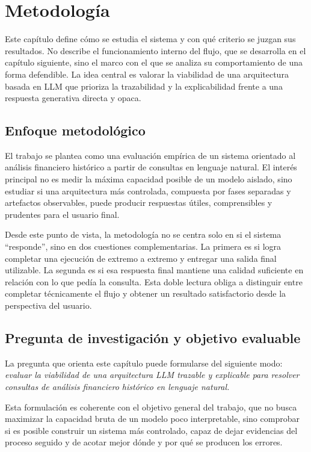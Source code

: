 \chapter{Metodolog\'ia}

Este cap\'itulo define c\'omo se estudia el sistema y con qu\'e criterio se juzgan sus resultados. No describe el funcionamiento interno del flujo, que se
desarrolla en el cap\'itulo siguiente, sino el marco con el que se analiza su comportamiento de una forma defendible. La idea central es valorar la
viabilidad de una arquitectura basada en LLM que prioriza la trazabilidad y la explicabilidad frente a una respuesta generativa directa y opaca.

\section{Enfoque metodol\'ogico}

El trabajo se plantea como una evaluaci\'on emp\'irica de un sistema orientado al an\'alisis financiero hist\'orico a partir de consultas en lenguaje natural.
El inter\'es principal no es medir la m\'axima capacidad posible de un modelo aislado, sino estudiar si una arquitectura m\'as controlada, compuesta por
fases separadas y artefactos observables, puede producir respuestas \'utiles, comprensibles y prudentes para el usuario final.

Desde este punto de vista, la metodolog\'ia no se centra solo en si el sistema ``responde'', sino en dos cuestiones complementarias. La primera es si logra
completar una ejecuci\'on de extremo a extremo y entregar una salida final utilizable. La segunda es si esa respuesta final mantiene una calidad
suficiente en relaci\'on con lo que ped\'ia la consulta. Esta doble lectura obliga a distinguir entre completar t\'ecnicamente el flujo y obtener un
resultado satisfactorio desde la perspectiva del usuario.

\section{Pregunta de investigaci\'on y objetivo evaluable}

La pregunta que orienta este cap\'itulo puede formularse del siguiente modo: \textit{evaluar la viabilidad de una arquitectura LLM trazable y explicable
para resolver consultas de an\'alisis financiero hist\'orico en lenguaje natural.}

Esta formulaci\'on es coherente con el objetivo general del trabajo, que no busca maximizar la capacidad bruta de un modelo poco interpretable, sino
comprobar si es posible construir un sistema m\'as controlado, capaz de dejar evidencias del proceso seguido y de acotar mejor d\'onde y por qu\'e se
producen los errores.

